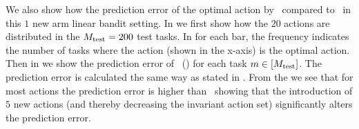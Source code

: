 We also show how the prediction error of the optimal action by \pred\ compared to \linucb\ in this $1$ new arm linear bandit setting. In  we first show how the $20$ actions are distributed in the $M_{\text{test}}=200$ test tasks. In  for each bar, the frequency indicates the number of tasks where the action (shown in the x-axis) is the optimal action. Then in  we show the prediction error of \pred\ (\gt) for each task $m\in[M_{\text{test}}]$. The prediction error is calculated the same way as stated in . 
%
From the  we see that for most actions the prediction error is higher than \linucb\ showing that the introduction of $5$ new actions (and thereby decreasing the invariant action set) significantly alters the prediction error.
%


